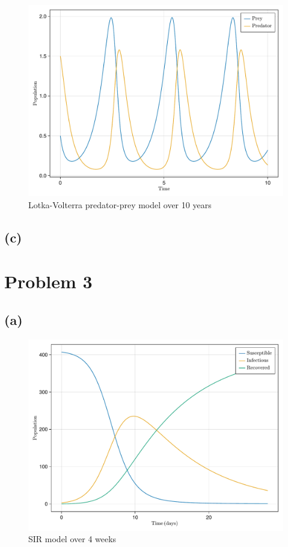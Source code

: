 \documentclass[a4paper, british]{article}
\begin{document}
\begin{figure}[H]
    \centering
    \includegraphics[width=\textwidth]{figures/f2.pdf}
    \caption{Lotka-Volterra predator-prey model over 10 years}
    \label{fig:2}
\end{figure}

\subsection*{(c)}

\section{Problem 3}

\subsection*{(a)}

\begin{figure}[H]
    \centering
    \includegraphics[width=\textwidth]{figures/f3.pdf}
    \caption{SIR model over 4 weeks}
    \label{fig:3}
\end{figure}
\end{document}
